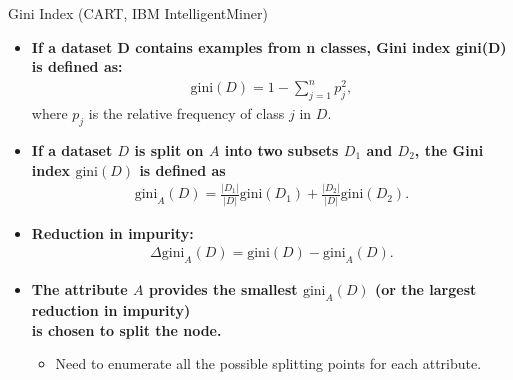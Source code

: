 \begin{frame}{Gini Index (CART, IBM IntelligentMiner)}
  \begin{itemize}
  \item \textbf{If a dataset D contains examples from n classes, Gini index gini(D) is defined as:}
    \begin{align}
      \text{gini}(D) = 1-\sum_{j=1}^{n} p_j^2,
    \end{align}
    where $p_j$ is the relative frequency of class $j$ in $D$.
  \item \textbf{If a dataset $D$ is split on $A$ into two subsets $D_1$ and $D_2$, the Gini index $\text{gini}(D)$ is defined as}
    \begin{align}
      \text{gini}_A(D) = \frac{|D_1|}{|D|}\text{gini}(D_1)+\frac{|D_2|}{|D|}\text{gini}(D_2).
    \end{align}
  \item \textbf{Reduction in impurity:}
    \begin{align}
      \Delta \text{gini}_A(D) = \text{gini}(D)-\text{gini}_A(D).
    \end{align}
  \item \textbf{The attribute $A$ provides the smallest $\text{gini}_A(D)$ (or the largest reduction in impurity) \\ is chosen to split the node.}
    \begin{itemize}
    \item Need to enumerate all the possible splitting points for each attribute.
    \end{itemize}
  \end{itemize}
\end{frame}


